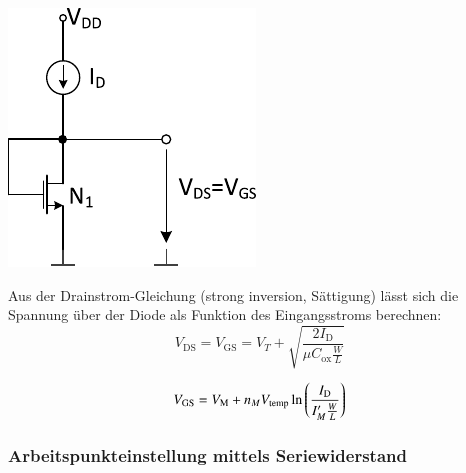 \begin{minipage}[t]{0.3\columnwidth}
    \includegraphics[width=\columnwidth, align=t]{images/04_MOS_diode_mit_stromquelle.pdf}
\end{minipage}
\hfill
\begin{minipage}[t]{0.66\columnwidth}
    Aus der Drainstrom-Gleichung (strong inversion, Sättigung) lässt sich die Spannung über der Diode als Funktion des Eingangsstroms berechnen:
    \[
        V_\text{DS} = V_\text{GS} = V_T + \sqrt{\frac{2 I_\text{D}}{\mu C_\text{ox} \frac{W}{L}}}
    \]

    \[
        V_{\rm GS} = V_\text{M} + n_M V_\text{temp} \ln\left(\frac{I_\text{D}}{I_M' \frac{W}{L}}\right)
    \]
\end{minipage}


\subsubsection{Arbeitspunkteinstellung mittels Seriewiderstand}

